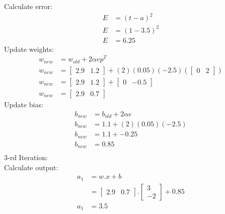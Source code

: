 \documentclass{article}
\begin{document}
	Calculate error: 
	\begin{equation}
		\begin{split}
			E & = (t - a)^2 \\
			E & = (1 - 3.5)^2 \\
			E & = 6.25
		\end{split}
	\end{equation}
	Update weights:
	\begin{equation}
		\begin{split}
			w_{new} & = w_{old} + 2 \alpha e p^T \\
			w_{new} & = \begin{bmatrix}
				2.9 & 1.2
			\end{bmatrix} + (2)(0.05)(-2.5) (\begin{bmatrix}
				0 & 2
			\end{bmatrix} ) \\
			w_{new} & = \begin{bmatrix}
				2.9 & 1.2
			\end{bmatrix} + \begin{bmatrix}
				0 & -0.5
			\end{bmatrix} \\
			w_{new} & = \begin{bmatrix}
				2.9 & 0.7
			\end{bmatrix}
		\end{split}
	\end{equation}
	Update bias:
	\begin{equation}
		\begin{split}
			b_{new} & = b_{old} + 2 \alpha e \\
			b_{new} & = 1.1 + (2)(0.05)(-2.5) \\
			b_{new} & = 1.1 + -0.25 \\
			b_{new} & = 0.85 \\
		\end{split}
	\end{equation}
	3-rd Iteration: \\
	Calculate output: 
	\begin{equation}
		\begin{split}
			a_1 & = w.x+b \\
			& = \begin{bmatrix}
				2.9 & 0.7
			\end{bmatrix}. \begin{bmatrix}
				3 \\ -2
			\end{bmatrix} + 0.85 \\
			a_1 & = 3.5
		\end{split}
	\end{equation}
\end{document}
